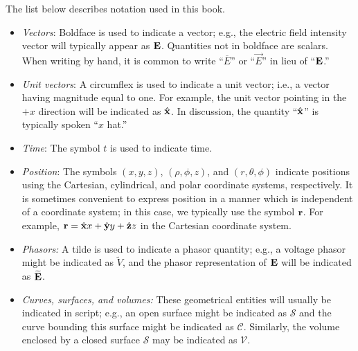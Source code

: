 

\label{m0005_Notation} %

The list below describes notation used in this book. 
%
\begin{itemize}
\item \emph{Vectors}: Boldface is used to indicate a vector; e.g., the electric field intensity vector will typically appear as ${\bf E}$.  Quantities not in boldface are scalars.  When writing by hand, it is common to write ``$\overline{E}$'' or ``$\overrightarrow{E}$'' in lieu of ``${\bf E}$.''
\item \emph{Unit vectors}: A circumflex is used to indicate a unit vector; i.e., a vector having magnitude equal to one.  For example, the unit vector pointing in the $+x$ direction will be indicated as $\hat{\bf x}$.  In discussion, the quantity ``$\hat{\bf x}$'' is typically spoken ``$x$ hat.'' 
\item \emph{Time}: The symbol $t$ is used to indicate time. 
\item \emph{Position}: The symbols $(x,y,z)$, $(\rho,\phi,z)$, and $(r,\theta,\phi)$ indicate positions using the Cartesian, cylindrical, and polar coordinate systems, respectively.  It is sometimes convenient to express position in a manner which is independent of a coordinate system; in this case, we typically use the symbol ${\bf r}$. For example, ${\bf r}=\hat{\bf x}x+\hat{\bf y}y+\hat{\bf z}z$ in the Cartesian coordinate system.
\item \emph{Phasors:}  A tilde is used to indicate a phasor quantity; e.g., a voltage phasor might be indicated as $\widetilde{V}$, and the phasor representation of ${\bf E}$ will be indicated as $\widetilde{{\bf E}}$.
\item \emph{Curves, surfaces, and volumes:} These geometrical entities will usually be indicated in script; e.g., an open surface might be indicated as $\mathcal{S}$ and the curve bounding this surface might be indicated as $\mathcal{C}$.  Similarly, the volume enclosed by a closed surface $\mathcal{S}$ may be indicated as $\mathcal{V}$.

\end{itemize}
